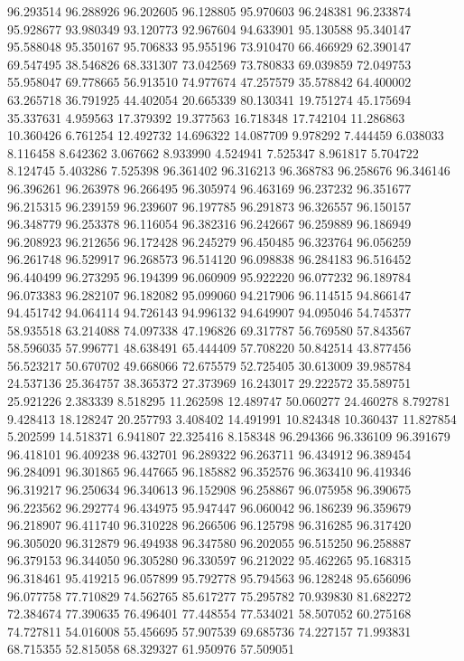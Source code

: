 96.293514
96.288926
96.202605
96.128805
95.970603
96.248381
96.233874
95.928677
93.980349
93.120773
92.967604
94.633901
95.130588
95.340147
95.588048
95.350167
95.706833
95.955196
73.910470
66.466929
62.390147
69.547495
38.546826
68.331307
73.042569
73.780833
69.039859
72.049753
55.958047
69.778665
56.913510
74.977674
47.257579
35.578842
64.400002
63.265718
36.791925
44.402054
20.665339
80.130341
19.751274
45.175694
35.337631
4.959563
17.379392
19.377563
16.718348
17.742104
11.286863
10.360426
6.761254
12.492732
14.696322
14.087709
9.978292
7.444459
6.038033
8.116458
8.642362
3.067662
8.933990
4.524941
7.525347
8.961817
5.704722
8.124745
5.403286
7.525398
96.361402
96.316213
96.368783
96.258676
96.346146
96.396261
96.263978
96.266495
96.305974
96.463169
96.237232
96.351677
96.215315
96.239159
96.239607
96.197785
96.291873
96.326557
96.150157
96.348779
96.253378
96.116054
96.382316
96.242667
96.259889
96.186949
96.208923
96.212656
96.172428
96.245279
96.450485
96.323764
96.056259
96.261748
96.529917
96.268573
96.514120
96.098838
96.284183
96.516452
96.440499
96.273295
96.194399
96.060909
95.922220
96.077232
96.189784
96.073383
96.282107
96.182082
95.099060
94.217906
96.114515
94.866147
94.451742
94.064114
94.726143
94.996132
94.649907
94.095046
54.745377
58.935518
63.214088
74.097338
47.196826
69.317787
56.769580
57.843567
58.596035
57.996771
48.638491
65.444409
57.708220
50.842514
43.877456
56.523217
50.670702
49.668066
72.675579
52.725405
30.613009
39.985784
24.537136
25.364757
38.365372
27.373969
16.243017
29.222572
35.589751
25.921226
2.383339
8.518295
11.262598
12.489747
50.060277
24.460278
8.792781
9.428413
18.128247
20.257793
3.408402
14.491991
10.824348
10.360437
11.827854
5.202599
14.518371
6.941807
22.325416
8.158348
96.294366
96.336109
96.391679
96.418101
96.409238
96.432701
96.289322
96.263711
96.434912
96.389454
96.284091
96.301865
96.447665
96.185882
96.352576
96.363410
96.419346
96.319217
96.250634
96.340613
96.152908
96.258867
96.075958
96.390675
96.223562
96.292774
96.434975
95.947447
96.060042
96.186239
96.359679
96.218907
96.411740
96.310228
96.266506
96.125798
96.316285
96.317420
96.305020
96.312879
96.494938
96.347580
96.202055
96.515250
96.258887
96.379153
96.344050
96.305280
96.330597
96.212022
95.462265
95.168315
96.318461
95.419215
96.057899
95.792778
95.794563
96.128248
95.656096
96.077758
77.710829
74.562765
85.617277
75.295782
70.939830
81.682272
72.384674
77.390635
76.496401
77.448554
77.534021
58.507052
60.275168
74.727811
54.016008
55.456695
57.907539
69.685736
74.227157
71.993831
68.715355
52.815058
68.329327
61.950976
57.509051
